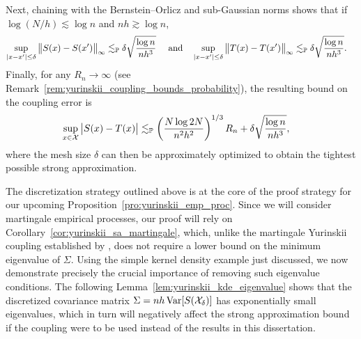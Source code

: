 Next, chaining with the Bernstein--Orlicz and sub-Gaussian norms
\citep[Section~2.2]{van1996weak} shows that if
$\log(N/h) \lesssim \log n$ and $n h \gtrsim \log n$,
%
\begin{align*}
  \sup_{|x-x'| \leq \delta}
  \big\|S(x) - S(x') \big\|_\infty
  &\lesssim_\P
  \delta
  \sqrt{\frac{\log n}{n h^3}} \ \quad\text{and}\quad
  \sup_{|x-x'| \leq \delta}
  \big\|T(x) - T(x')\big\|_\infty
  \lesssim_\P
  \delta
  \sqrt{\frac{\log n}{n h^3}}.
\end{align*}
%
Finally, for any $R_n\to\infty$
(see Remark~\ref{rem:yurinskii_coupling_bounds_probability}),
the resulting bound on the coupling error is
%
\begin{align*}
  \sup_{x \in \cX}
  \big| S(x) - T(x) \big|
  &\lesssim_\P
  \left( \frac{N \log 2N}{n^2 h^2} \right)^{1/3} R_n
  + \delta \sqrt{\frac{\log n}{n h^3}},
\end{align*}
%
where the mesh size $\delta$ can then be approximately
optimized to obtain the tightest possible strong approximation.

The discretization strategy outlined above is at the core of the proof strategy
for our upcoming Proposition~\ref{pro:yurinskii_emp_proc}. Since we will
consider
martingale empirical processes, our proof will rely on
Corollary~\ref{cor:yurinskii_sa_martingale}, which, unlike the martingale
Yurinskii
coupling established by \citet{li2020uniform}, does not require a lower bound
on the minimum eigenvalue of $\Sigma$. Using the simple kernel density example
just discussed, we now demonstrate precisely the crucial importance of removing
such eigenvalue conditions. The following
Lemma~\ref{lem:yurinskii_kde_eigenvalue} shows
that the discretized covariance matrix $\Sigma = n h\Var[S(\cX_\delta)]$ has
exponentially small eigenvalues, which in turn will negatively affect the
strong approximation bound if the \citet{li2020uniform} coupling were to be
used instead of the results in this dissertation.

